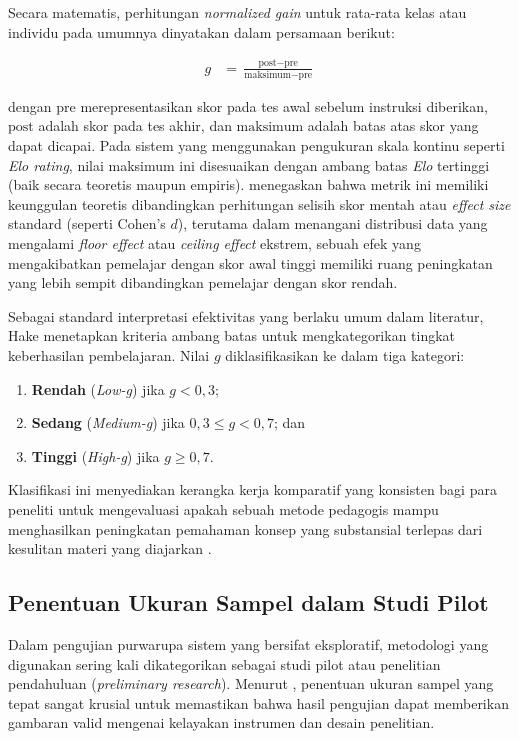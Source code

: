 Secara matematis, perhitungan \textit{normalized gain} untuk rata-rata kelas
atau individu pada umumnya dinyatakan dalam persamaan berikut:

\begin{align}
    g &= \frac{\text{post} - \text{pre}}{\text{maksimum} - \text{pre}} \label{eq:normalized_gain_formula}
\end{align}

dengan $\text{pre}$ merepresentasikan skor pada tes awal sebelum
instruksi diberikan, $\text{post}$ adalah skor pada tes akhir, dan $\text{maksimum}$ adalah batas atas skor yang dapat dicapai. Pada sistem yang menggunakan pengukuran skala kontinu seperti \textit{Elo rating}, nilai maksimum ini disesuaikan dengan ambang batas \textit{Elo} tertinggi (baik secara teoretis maupun empiris).
\textcite{Coletta2020} menegaskan bahwa metrik ini memiliki keunggulan teoretis
dibandingkan perhitungan selisih skor mentah atau \textit{effect size} standard
(seperti Cohen's $d$), terutama dalam menangani distribusi data yang mengalami
\textit{floor effect} atau \textit{ceiling effect} ekstrem, sebuah efek yang
mengakibatkan pemelajar dengan
skor awal tinggi memiliki ruang peningkatan yang lebih sempit dibandingkan pemelajar
dengan skor rendah.

Sebagai standard interpretasi efektivitas yang berlaku umum dalam literatur, Hake
menetapkan kriteria ambang batas untuk mengkategorikan tingkat keberhasilan
pembelajaran. Nilai $g$ diklasifikasikan ke dalam tiga kategori:

\begin{enumerate}[1.]
    \item \textbf{Rendah} (\textit{Low-g}) jika $g < 0{,}3$; 
    \item \textbf{Sedang}
    (\textit{Medium-g}) jika $0{,}3 \leq g < 0{,}7$; dan 
    \item \textbf{Tinggi}
    (\textit{High-g}) jika $g \geq 0{,}7$.
\end{enumerate}

Klasifikasi ini menyediakan kerangka kerja komparatif yang konsisten bagi para peneliti untuk mengevaluasi apakah sebuah
metode pedagogis mampu menghasilkan peningkatan pemahaman konsep yang substansial
terlepas dari kesulitan materi yang diajarkan \autocite{Coletta2020}.

\subsection{Penentuan Ukuran Sampel dalam Studi Pilot}
\label{ssec:ukuran_sampel}
Dalam pengujian purwarupa sistem yang bersifat eksploratif, metodologi yang digunakan sering kali dikategorikan sebagai studi pilot atau penelitian pendahuluan (\textit{preliminary research}). Menurut \textcite{Sukserm2024}, penentuan ukuran sampel yang tepat sangat krusial untuk memastikan bahwa hasil pengujian dapat memberikan gambaran valid mengenai kelayakan instrumen dan desain penelitian.

